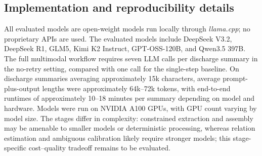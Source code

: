 \FloatBarrier
\subsection{Implementation and reproducibility details}\label{ch08:supp:implementation}
\noindent
All evaluated models are open-weight models run locally through \textit{llama.cpp}; no proprietary APIs are used.
The evaluated models include DeepSeek V3.2, DeepSeek R1, GLM5, Kimi K2 Instruct, GPT-OSS-120B, and Qwen3.5 397B.
The full multimodal workflow requires seven LLM calls per discharge summary in the no-retry setting, compared with one call for the single-step baseline.
On discharge summaries averaging approximately 15k characters, average prompt-plus-output lengths were approximately 64k--72k tokens, with end-to-end runtimes of approximately 10--18 minutes per summary depending on model and hardware.
Models were run on NVIDIA A100 GPUs, with GPU count varying by model size.
The stages differ in complexity: constrained extraction and assembly may be amenable to smaller models or deterministic processing, whereas relation estimation and ambiguous calibration likely require stronger models; this stage-specific cost--quality tradeoff remains to be evaluated.

